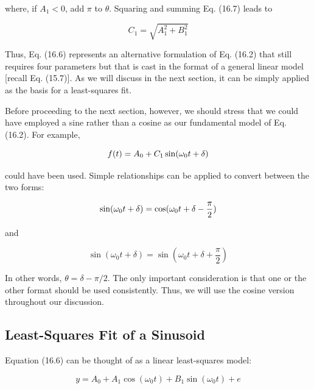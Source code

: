 \documentclass[../main.tex]{subfiles}
\begin{document}
\noindent where, if $A_1 < 0$, add $\pi$ to $\theta$. Squaring and summing Eq. (16.7) leads to

\begin{equation}
	\tag{16.9}
	C_1 = \sqrt{A^2_1 + B ^2_1}
\end{equation}

\noindent Thus, Eq. (16.6) represents an alternative formulation of Eq. (16.2) that still requires four parameters but that is cast in the format of a general linear model [recall Eq. (15.7)]. As we will
discuss in the next section, it can be simply applied as the basis for a least-squares fit.

Before proceeding to the next section, however, we should stress that we could have
employed a sine rather than a cosine as our fundamental model of Eq. (16.2). For example,

\begin{equation}
	\notag
	f(t) = A_0 + C_1 \sin(\omega_0 t + \delta)
\end{equation}

\noindent could have been used. Simple relationships can be applied to convert between the two forms:

\begin{equation}
	\notag
	\sin(\omega_0 t + \delta) = \cos(\omega_0 t + \delta - \frac{\pi}{2})
\end{equation}

\noindent and

\begin{equation}
	\tag{16.10}
	\sin(\omega_0 t + \delta) = \sin(\omega_0 t + \delta + \frac{\pi}{2})
\end{equation}

\noindent In other words, $\theta = \delta - \pi/2$. The only important consideration is that one or the other format
should be used consistently. Thus, we will use the cosine version throughout our discussion.

\label{cha:cha_P_16_1_1}
\subsection{Least-Squares Fit of a Sinusoid}

\noindent Equation (16.6) can be thought of as a linear least-squares model:

\begin{equation}
	\tag{16.11}
	y = A_0 + A_1 \cos(\omega_0 t) + B_1 \sin(\omega_0 t) + e
\end{equation}
\end{document}
